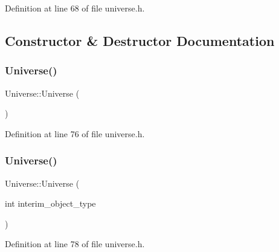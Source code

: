 Definition at line 68 of file universe.\+h.



\subsection{Constructor \& Destructor Documentation}
\mbox{\label{class_universe_a4d137a146dd3c2514dfb692dfbab6984}} 
\subsubsection{\texorpdfstring{Universe()}{Universe()}\hspace{0.1cm}{\footnotesize\ttfamily [1/3]}}
{\footnotesize\ttfamily Universe\+::\+Universe (\begin{DoxyParamCaption}{ }\end{DoxyParamCaption})\hspace{0.3cm}{\ttfamily [inline]}}



Definition at line 76 of file universe.\+h.

\mbox{\label{class_universe_a1210ce56049f1fc67f53aeda223bb82b}} 
\subsubsection{\texorpdfstring{Universe()}{Universe()}\hspace{0.1cm}{\footnotesize\ttfamily [2/3]}}
{\footnotesize\ttfamily Universe\+::\+Universe (\begin{DoxyParamCaption}\item[{int}]{interim\+\_\+object\+\_\+type }\end{DoxyParamCaption})\hspace{0.3cm}{\ttfamily [inline]}}



Definition at line 78 of file universe.\+h.

\mbox{\label{class_universe_a03af7455263d3028b55ca5dc93ebb6ba}} 
